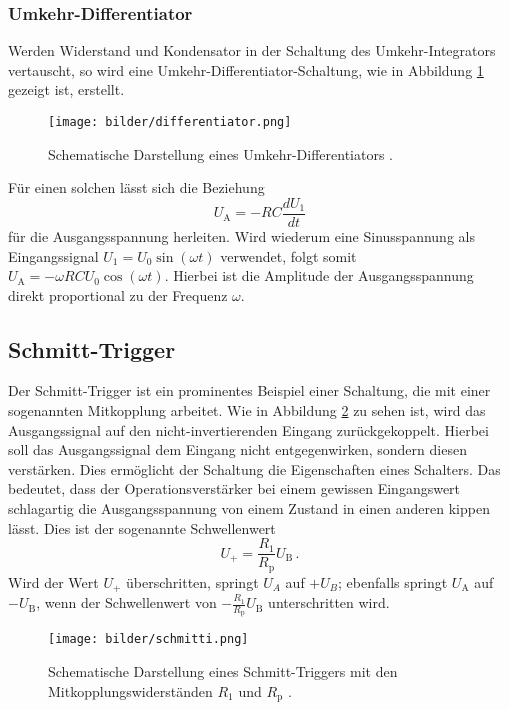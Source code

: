 \subsubsection{Umkehr-Differentiator}
Werden Widerstand und Kondensator in der Schaltung des Umkehr-Integrators vertauscht, so wird eine Umkehr-Differentiator-Schaltung, wie in Abbildung \ref{differentiator} gezeigt ist, erstellt.

\begin{figure}[H]
  \centering
  \texttt{[image: bilder/differentiator.png]}
  \caption{Schematische Darstellung eines Umkehr-Differentiators \cite{anleitung}.}
  \label{differentiator}
\end{figure}

Für einen solchen lässt sich die Beziehung
\begin{equation}
  U_\text{A}=-RC\frac{dU_1}{dt}
\end{equation}
für die Ausgangsspannung herleiten. Wird wiederum eine Sinusspannung als Eingangssignal $U_1=U_0\sin(\omega t)$ verwendet, folgt somit $U_\text{A}=-\omega RCU_0\cos(\omega t)$. Hierbei ist die Amplitude der Ausgangsspannung direkt proportional zu der Frequenz $\omega$.
\subsection{Schmitt-Trigger}
Der Schmitt-Trigger ist ein prominentes Beispiel einer Schaltung, die mit einer sogenannten Mitkopplung arbeitet. Wie in Abbildung \ref{schmitti} zu sehen ist, wird das Ausgangssignal auf den nicht-invertierenden Eingang zurückgekoppelt. Hierbei soll das Ausgangssignal dem Eingang nicht entgegenwirken, sondern diesen verstärken. Dies ermöglicht der Schaltung die Eigenschaften eines Schalters. Das bedeutet, dass der Operationsverstärker bei einem gewissen Eingangswert schlagartig die Ausgangsspannung von einem Zustand in einen anderen kippen lässt.
Dies ist der sogenannte Schwellenwert
\begin{equation}
U_+=\frac{R_1}{R_\text{p}}U_\text{B}\,.
\end{equation}
Wird der Wert $U_+$ überschritten, springt $U_A$ auf $+U_B$; ebenfalls springt $U_\text{A}$ auf $-U_\text{B}$, wenn der Schwellenwert von $-\frac{R_1}{R_\text{p}}U_\text{B}$ unterschritten wird.

\begin{figure}[H]
  \centering
  \texttt{[image: bilder/schmitti.png]}
  \caption{Schematische Darstellung eines Schmitt-Triggers mit den Mitkopplungswiderständen $R_1$ und $R_\text{p}$ \cite{anleitung}.}
  \label{schmitti}
\end{figure}
